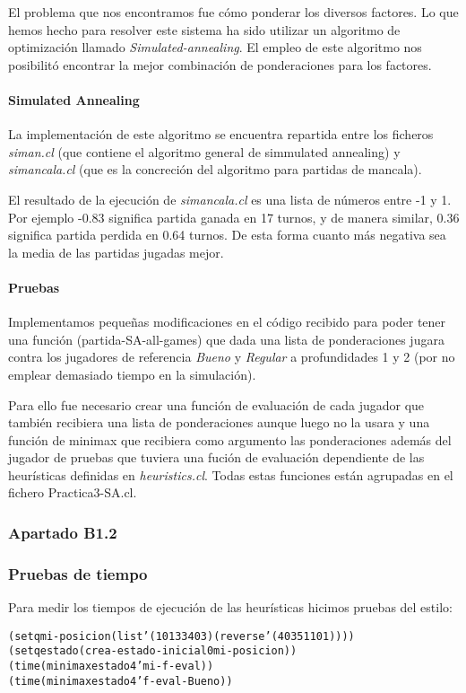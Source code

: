 \documentclass[nochap]{apuntes}
\begin{document}
El problema que nos encontramos fue cómo ponderar los diversos factores. Lo que hemos hecho para resolver este sistema ha sido utilizar un algoritmo de optimización llamado \textit{Simulated-annealing}. El empleo de este algoritmo nos posibilitó encontrar la mejor combinación de ponderaciones para los factores.

\paragraph{Simulated Annealing}
La implementación de este algoritmo se encuentra repartida entre los ficheros \textit{siman.cl} (que contiene el algoritmo general de simmulated annealing) y \textit{simancala.cl} (que es la concreción del algoritmo para partidas de mancala).

El resultado de la ejecución de \textit{simancala.cl} es una lista de números entre -1 y 1. Por ejemplo -0.83 significa partida ganada en 17 turnos, y de manera similar, 0.36 significa partida perdida en 0.64 turnos. De esta forma cuanto más negativa sea la media de las partidas jugadas mejor. 


\paragraph{Pruebas}

Implementamos pequeñas modificaciones en el código recibido para poder tener una función (partida-SA-all-games) que dada una lista de ponderaciones jugara contra los jugadores de referencia \textit{Bueno} y \textit{Regular} a profundidades 1 y 2 (por no emplear demasiado tiempo en la simulación). 

Para ello fue necesario crear una función de evaluación de cada jugador que también recibiera una lista de ponderaciones aunque luego no la usara y una función de minimax que recibiera como argumento las ponderaciones además del jugador de pruebas que tuviera una fución de evaluación dependiente de las heurísticas definidas en \textit{heuristics.cl}. Todas estas funciones están agrupadas en el fichero Practica3-SA.cl. 


\subsubsection*{Apartado B1.2}
\subsubsection*{Pruebas de tiempo}
Para medir los tiempos de ejecución de las heurísticas hicimos pruebas del estilo:
\begin{alltt}
(setq mi-posicion (list '(1 0 1 3 3 4 0 3) (reverse '(4 0 3 5 1 1 0 1))))
(setq estado (crea-estado-inicial 0 mi-posicion))
(time (minimax estado 4 'mi-f-eval))
(time (minimax estado 4 'f-eval-Bueno))
\end{alltt}
\end{document}
